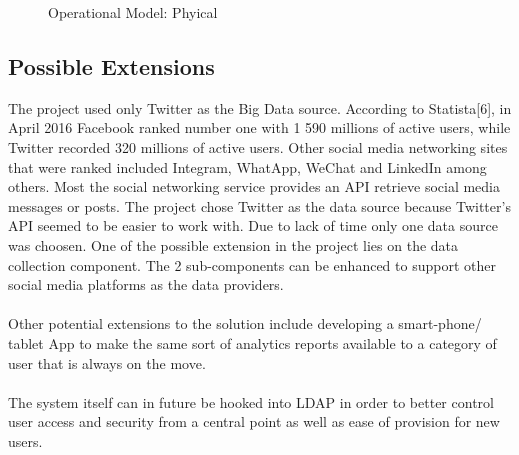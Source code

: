 \documentclass[12pt]{article} %
\begin{document}
	
		\begin{figure}[H] %
			\caption{Operational Model: Phyical}
			\label{fig:speciation}
		\end{figure}
	
	
	\subsection{Possible Extensions}
	
	The project used only Twitter as the Big Data source. According to Statista[6], in April 2016 Facebook ranked number one with 1 590 millions of active users, while Twitter recorded 320 millions of active users. Other social media networking sites that were ranked included Integram, WhatApp, WeChat and LinkedIn among others. Most the social networking service provides an API retrieve social media messages or posts. The project chose Twitter as the data source because Twitter's API seemed to be easier to work with. Due to lack of time only one data source was choosen. One of the possible extension in the project lies on the data collection component. The 2 sub-components can be enhanced to support other social media platforms as the data providers.
	\\
	\\
	Other potential extensions to the solution include developing a smart-phone/ tablet App to make the same sort of analytics reports available to a category of user that is always on the move.
	\\
	\\
	The system itself can in future be hooked into LDAP in order to better control user access and security from a central point as well as ease of provision for new users.
	
\end{document}
